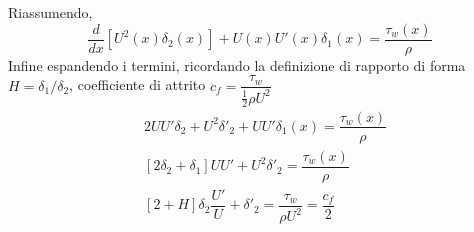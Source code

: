  Riassumendo,
 \begin{equation}
  \dfrac{d}{d x} \left[ U^2(x) \delta_2(x) \right] + U (x)U' (x)\delta_1(x) = \dfrac{\tau_w(x)}{\rho}
 \end{equation}
 Infine espandendo i termini, ricordando la definizione di rapporto di forma $H = \delta_1 / \delta_2$, coefficiente di attrito $c_f = \dfrac{\tau_w}{\frac{1}{2}\rho U^2}$
 \begin{equation}
 \begin{aligned}
  & 2 U U' \delta_2 + U^2 \delta'_2 + U U' \delta_1(x) = \dfrac{\tau_w(x)}{\rho} \\
  & [ 2 \delta_2 + \delta_1] U U' + U^2 \delta'_2 = \dfrac{\tau_w(x)}{\rho} \\
  & [ 2 + H ]\delta_2 \dfrac{U'}{U}  + \delta'_2 = \dfrac{\tau_w}{\rho U^2} = \dfrac{c_f}{2}
 \end{aligned}
 \end{equation}









